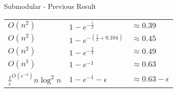 \begin{frame}{Submodular - Previous Result}
    \begin{center}
        \Large
        \begin{tabular}{l l l}
            \hline
            $O(n^2)$
            &
            $1 - e^{-\frac{1}{2}}$
            &
            $\approx 0.39$
            \\
            \color{orange}$O(n^2)$
            &
            \color{orange}$1 - e^{-(\frac{1}{2} + 0.104)}$
            &
            $\approx 0.45$
            \\
            \color{orange}$O(n^2)$
            & 
            \color{orange}$1 - e^{-\frac{2}{3}}$ 
            &
            $\approx 0.49$
            \\
            $O(n^5)$
            & 
            $1 - e^{-1}$ 
            &
            $\approx 0.63$
            \\
            $\frac{1}{\epsilon}^{O(\epsilon^{-4})}n \log^2 n$
            & 
            $1 - e^{-1} - \epsilon$ 
            &
            $\approx 0.63 - \epsilon$
            \\
            \hline
        \end{tabular}
        
    \end{center}
\end{frame}